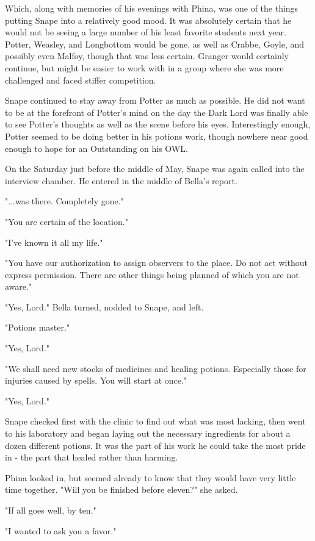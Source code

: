 \documentclass[a4paper,11pt]{article}
\begin{document}
Which, along with memories of his evenings with Phina, was one of the things putting Snape into a relatively good mood. It was absolutely certain that he would not be seeing a large number of his least favorite students next year. Potter, Weasley, and Longbottom would be gone, as well as Crabbe, Goyle, and possibly even Malfoy, though that was less certain. Granger would certainly continue, but might be easier to work with in a group where she was more challenged and faced stiffer competition.

Snape continued to stay away from Potter as much as possible. He did not want to be at the forefront of Potter's mind on the day the Dark Lord was finally able to see Potter's thoughts as well as the scene before his eyes. Interestingly enough, Potter seemed to be doing better in his potions work, though nowhere near good enough to hope for an Outstanding on his OWL.

On the Saturday just before the middle of May, Snape was again called into the interview chamber. He entered in the middle of Bella's report.

"...was there. Completely gone."

"You are certain of the location."

"I've known it all my life."

"You have our authorization to assign observers to the place. Do not act without express permission. There are other things being planned of which you are not aware."

"Yes, Lord." Bella turned, nodded to Snape, and left.

"Potions master."

"Yes, Lord."

"We shall need new stocks of medicines and healing potions. Especially those for injuries caused by spells. You will start at once."

"Yes, Lord."

Snape checked first with the clinic to find out what was most lacking, then went to his laboratory and began laying out the necessary ingredients for about a dozen different potions. It was the part of his work he could take the most pride in - the part that healed rather than harming.

Phina looked in, but seemed already to know that they would have very little time together. "Will you be finished before eleven?" she asked.

"If all goes well, by ten."

"I wanted to ask you a favor."
\end{document}
